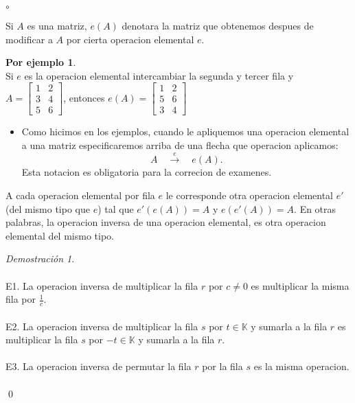 \documentclass{article}
\theoremstyle{definition}
\theoremstyle{definition}
\newtheorem*{ej}{Por ejemplo}
\theoremstyle{remark}
\newtheorem*{demo}{Demostración}
\begin{document}
\begin{list}{$\circ$}{}  
\item Si $A$ es una matriz, $e(A)$ denotara la matriz que obtenemos despues de modificar a $A$ por cierta operacion elemental $e$.
\end{list}
\begin{ej}\;\\
  Si $e$ es la operacion elemental intercambiar la segunda y tercer fila y \mbox{$A = \begin{bmatrix}
    1 & 2 \\ 
  3 & 4 \\
5 & 6
\end{bmatrix}$}, entonces $e(A)=\begin{bmatrix} 1 & 2 \\ 5 & 6 \\ 3 & 4 \end{bmatrix}$
\end{ej}
\begin{itemize}
  \item Como hicimos en los ejemplos, cuando le apliquemos una operacion elemental a una matriz especificaremos arriba de una flecha que operacion aplicamos: \[
      A \quad  \overset{e}{\longrightarrow}  \quad e(A).
    \]
    Esta notacion es obligatoria para la correcion de examenes.
\end{itemize}
\begin{teo}
  A cada operacion elemental por fila $e$ le corresponde otra operacion elemental $e'$ (del mismo tipo que $e$) tal que $e'(e(A))=A$ y $e(e'(A)) = A$. En otras palabras, la operacion inversa de una operacion elemental, es otra operacion elemental del mismo tipo.
\end{teo}
\begin{demo}
  \;\\\\
\textcolor{azulp2}{E1.} La operacion inversa de multiplicar la fila $r$ por $c \neq 0$ es multiplicar la misma fila por $\frac{1}{c}$.\\\\
\textcolor{azulp2}{E2.} La operacion inversa de multiplicar la fila $s$ por $t \in \mathbb{K}$ y sumarla a la fila $r$ es multiplicar la fila $s$ por $-t \in \mathbb{K}$ y sumarla a la fila $r$.\\\\
\textcolor{azulp2}{E3.} La operacion inversa de permutar la fila $r$ por la fila $s$ es la misma operacion. \\\\\qed
\end{demo}\pagebreak
\end{document}
